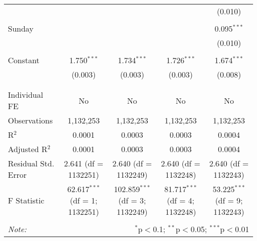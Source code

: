 \documentclass[
]{article}
\begin{document}
\begin{table}[!htbp]
{\begin{tabular}{@{\extracolsep{5pt}}lcccc}
  &  &  &  & (0.010) \\ 
  & & & & \\ 
 Sunday &  &  &  & 0.095$^{***}$ \\ 
  &  &  &  & (0.010) \\ 
  & & & & \\ 
 Constant & 1.750$^{***}$ & 1.734$^{***}$ & 1.726$^{***}$ & 1.674$^{***}$ \\ 
  & (0.003) & (0.003) & (0.003) & (0.008) \\ 
  & & & & \\ 
\hline \\[-1.8ex] 
Individual FE & No & No & No & No \\ 
Observations & 1,132,253 & 1,132,253 & 1,132,253 & 1,132,253 \\ 
R$^{2}$ & 0.0001 & 0.0003 & 0.0003 & 0.0004 \\ 
Adjusted R$^{2}$ & 0.0001 & 0.0003 & 0.0003 & 0.0004 \\ 
Residual Std. Error & 2.641 (df = 1132251) & 2.640 (df = 1132249) & 2.640 (df = 1132248) & 2.640 (df = 1132243) \\ 
F Statistic & 62.617$^{***}$ (df = 1; 1132251) & 102.859$^{***}$ (df = 3; 1132249) & 81.717$^{***}$ (df = 4; 1132248) & 53.225$^{***}$ (df = 9; 1132243) \\ 
\hline 
\hline \\[-1.8ex] 
\textit{Note:}  & \multicolumn{4}{r}{$^{*}$p$<$0.1; $^{**}$p$<$0.05; $^{***}$p$<$0.01} \\ 
\end{tabular}
} 
\end{table} 
\newpage
\end{document}
